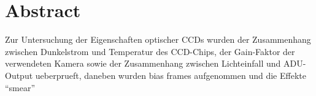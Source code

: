 \section{Abstract}
Zur Untersuchung der Eigenschaften optischer CCDs wurden der Zusammenhang zwischen Dunkelstrom und Temperatur des CCD-Chips, der Gain-Faktor der verwendeten Kamera sowie der Zusammenhang zwischen Lichteinfall und ADU-Output ueberprueft, daneben wurden bias frames aufgenommen und die Effekte \enquote{smear}